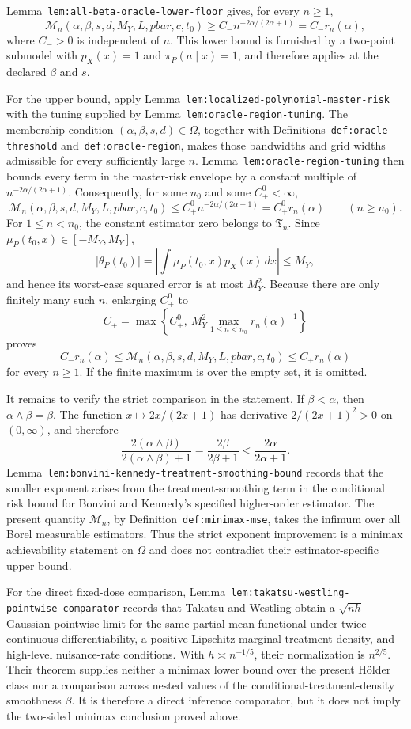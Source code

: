 Lemma~\texttt{lem:all-beta-oracle-lower-floor} gives, for every \(n\ge1\),
\[
\mathcal M_n(\alpha,\beta,s,d,M_Y,L,pbar,c,t_0)
\ge C_-n^{-2\alpha/(2\alpha+1)}
=C_-r_n(\alpha),
\]
where \(C_->0\) is independent of \(n\). This lower bound is furnished by a two-point submodel with \(p_X(x)=1\) and \(\pi_P(a\mid x)=1\), and therefore applies at the declared \(\beta\) and \(s\).

For the upper bound, apply Lemma~\texttt{lem:localized-polynomial-master-risk} with the tuning supplied by Lemma~\texttt{lem:oracle-region-tuning}. The membership condition \((\alpha,\beta,s,d)\in\Omega\), together with Definitions~\texttt{def:oracle-threshold} and~\texttt{def:oracle-region}, makes those bandwidths and grid widths admissible for every sufficiently large \(n\). Lemma~\texttt{lem:oracle-region-tuning} then bounds every term in the master-risk envelope by a constant multiple of \(n^{-2\alpha/(2\alpha+1)}\). Consequently, for some \(n_0\) and some \(C_+^0<\infty\),
\[
\mathcal M_n(\alpha,\beta,s,d,M_Y,L,pbar,c,t_0)
\le C_+^0n^{-2\alpha/(2\alpha+1)}
=C_+^0r_n(\alpha)
\qquad(n\ge n_0).
\]
For \(1\le n<n_0\), the constant estimator zero belongs to \(\mathfrak T_n\). Since \(\mu_P(t_0,x)\in[-M_Y,M_Y]\),
\[
\lvert\theta_P(t_0)\rvert
=\left\lvert\int\mu_P(t_0,x)p_X(x)\,dx\right\rvert
\le M_Y,
\]
and hence its worst-case squared error is at most \(M_Y^2\). Because there are only finitely many such \(n\), enlarging \(C_+^0\) to
\[
C_+=\max\left\{C_+^0,\ M_Y^2\max_{1\le n<n_0}r_n(\alpha)^{-1}\right\}
\]
proves
\[
C_-r_n(\alpha)
\le
\mathcal M_n(\alpha,\beta,s,d,M_Y,L,pbar,c,t_0)
\le
C_+r_n(\alpha)
\]
for every \(n\ge1\). If the finite maximum is over the empty set, it is omitted.

It remains to verify the strict comparison in the statement. If \(\beta<\alpha\), then \(\alpha\wedge\beta=\beta\). The function \(x\mapsto2x/(2x+1)\) has derivative \(2/(2x+1)^2>0\) on \((0,\infty)\), and therefore
\[
\frac{2(\alpha\wedge\beta)}{2(\alpha\wedge\beta)+1}
=
\frac{2\beta}{2\beta+1}
<
\frac{2\alpha}{2\alpha+1}.
\]
Lemma~\texttt{lem:bonvini-kennedy-treatment-smoothing-bound} records that the smaller exponent arises from the treatment-smoothing term in the conditional risk bound for Bonvini and Kennedy's specified higher-order estimator. The present quantity \(\mathcal M_n\), by Definition~\texttt{def:minimax-mse}, takes the infimum over all Borel measurable estimators. Thus the strict exponent improvement is a minimax achievability statement on \(\Omega\) and does not contradict their estimator-specific upper bound.

For the direct fixed-dose comparison, Lemma~\texttt{lem:takatsu-westling-pointwise-comparator} records that Takatsu and Westling obtain a \(\sqrt{nh}\)-Gaussian pointwise limit for the same partial-mean functional under twice continuous differentiability, a positive Lipschitz marginal treatment density, and high-level nuisance-rate conditions. With \(h\asymp n^{-1/5}\), their normalization is \(n^{2/5}\). Their theorem supplies neither a minimax lower bound over the present Hölder class nor a comparison across nested values of the conditional-treatment-density smoothness \(\beta\). It is therefore a direct inference comparator, but it does not imply the two-sided minimax conclusion proved above.